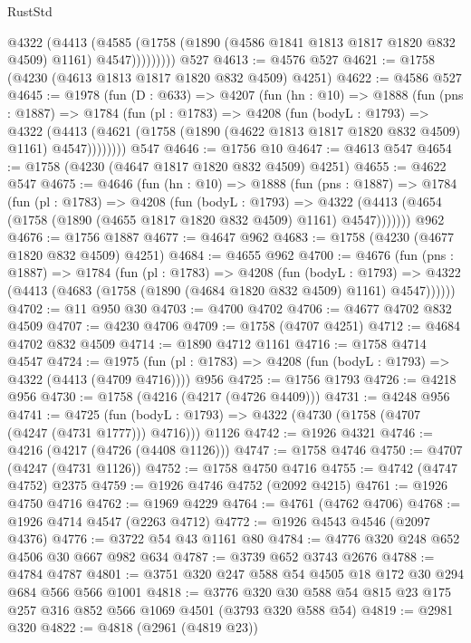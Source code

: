 \begin{lexlean}{RustStd}
\begin{coremodule}
              @4322
                (@4413
                  (@4585
                    (@1758 (@1890 (@4586 @1841 @1813 @1817 @1820 @832 @4509) @1161) @4547)))))))))
    @527
@4613 := @4576 @527
@4621 := @1758 (@4230 (@4613 @1813 @1817 @1820 @832 @4509) @4251)
@4622 := @4586 @527
@4645 := @1978
    (fun (D : @633) =>
    @4207
      (fun (hn : @10) =>
      @1888
        (fun (pns : @1887) =>
        @1784
          (fun (pl : @1783) =>
          @4208
            (fun (bodyL : @1793) =>
            @4322
              (@4413 (@4621 (@1758 (@1890 (@4622 @1813 @1817 @1820 @832 @4509) @1161) @4547))))))))
    @547
@4646 := @1756 @10
@4647 := @4613 @547
@4654 := @1758 (@4230 (@4647 @1817 @1820 @832 @4509) @4251)
@4655 := @4622 @547
@4675 := @4646
    (fun (hn : @10) =>
    @1888
      (fun (pns : @1887) =>
      @1784
        (fun (pl : @1783) =>
        @4208
          (fun (bodyL : @1793) =>
          @4322 (@4413 (@4654 (@1758 (@1890 (@4655 @1817 @1820 @832 @4509) @1161) @4547)))))))
    @962
@4676 := @1756 @1887
@4677 := @4647 @962
@4683 := @1758 (@4230 (@4677 @1820 @832 @4509) @4251)
@4684 := @4655 @962
@4700 := @4676
    (fun (pns : @1887) =>
    @1784
      (fun (pl : @1783) =>
      @4208
        (fun (bodyL : @1793) =>
        @4322 (@4413 (@4683 (@1758 (@1890 (@4684 @1820 @832 @4509) @1161) @4547))))))
@4702 := @11 @950 @30
@4703 := @4700 @4702
@4706 := @4677 @4702 @832 @4509
@4707 := @4230 @4706
@4709 := @1758 (@4707 @4251)
@4712 := @4684 @4702 @832 @4509
@4714 := @1890 @4712 @1161
@4716 := @1758 @4714 @4547
@4724 := @1975 (fun (pl : @1783) => @4208 (fun (bodyL : @1793) => @4322 (@4413 (@4709 @4716)))) @956
@4725 := @1756 @1793
@4726 := @4218 @956
@4730 := @1758 (@4216 (@4217 (@4726 @4409)))
@4731 := @4248 @956
@4741 := @4725
    (fun (bodyL : @1793) => @4322 (@4730 (@1758 (@4707 (@4247 (@4731 @1777))) @4716)))
    @1126
@4742 := @1926 @4321
@4746 := @4216 (@4217 (@4726 (@4408 @1126)))
@4747 := @1758 @4746
@4750 := @4707 (@4247 (@4731 @1126))
@4752 := @1758 @4750 @4716
@4755 := @4742 (@4747 @4752) @2375
@4759 := @1926 @4746 @4752 (@2092 @4215)
@4761 := @1926 @4750 @4716
@4762 := @1969 @4229
@4764 := @4761 (@4762 @4706)
@4768 := @1926 @4714 @4547 (@2263 @4712)
@4772 := @1926 @4543 @4546 (@2097 @4376)
@4776 := @3722 @54 @43 @1161 @80
@4784 := @4776 @320 @248 @652 @4506 @30 @667 @982 @634
@4787 := @3739 @652 @3743 @2676
@4788 := @4784 @4787
@4801 := @3751 @320 @247 @588 @54 @4505 @18 @172 @30 @294 @684 @566 @566 @1001
@4818 := @3776 @320 @30 @588 @54 @815 @23 @175 @257 @316 @852 @566 @1069 @4501 (@3793 @320 @588 @54)
@4819 := @2981 @320
@4822 := @4818 (@2961 (@4819 @23))

\end{coremodule}
\end{lexlean}
